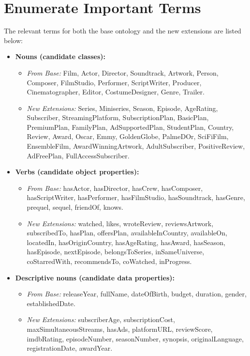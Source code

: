 \chapter{Enumerate Important Terms}
The relevant terms for both the base ontology and the new extensions are listed below:

\begin{itemize}
    \item \textbf{Nouns (candidate classes):}
    \begin{itemize}
        \item \textit{From Base:} Film, Actor, Director, Soundtrack, Artwork, Person, Composer, FilmStudio, Performer, ScriptWriter, Producer, Cinematographer, Editor, CostumeDesigner, Genre, Trailer.
        \item \textit{New Extensions:} Series, Miniseries, Season, Episode, AgeRating, Subscriber, StreamingPlatform, SubscriptionPlan, BasicPlan, PremiumPlan, FamilyPlan, AdSupportedPlan, StudentPlan, Country, Review, Award, Oscar, Emmy, GoldenGlobe, PalmeDOr, SciFiFilm, EnsembleFilm, AwardWinningArtwork, AdultSubscriber, PositiveReview, AdFreePlan, FullAccessSubscriber.
    \end{itemize}
    \item \textbf{Verbs (candidate object properties):}
    \begin{itemize}
        \item \textit{From Base:} hasActor, hasDirector, hasCrew, hasComposer, hasScriptWriter, hasPerformer, hasFilmStudio, hasSoundtrack, hasGenre, prequel, sequel, friendOf, knows.
        \item \textit{New Extensions:} watched, likes, wroteReview, reviewsArtwork, subscribedTo, hasPlan, offersPlan, availableInCountry, availableOn, locatedIn, hasOriginCountry, hasAgeRating, hasAward, hasSeason, hasEpisode, nextEpisode, belongsToSeries, inSameUniverse, coStarredWith, recommendsTo, coWatched, inProgress.
    \end{itemize}
    \item \textbf{Descriptive nouns (candidate data properties):}
    \begin{itemize}
        \item \textit{From Base:} releaseYear, fullName, dateOfBirth, budget, duration, gender, establishedDate.
        \item \textit{New Extensions:} subscriberAge, subscriptionCost, maxSimultaneousStreams, hasAds, platformURL, reviewScore, imdbRating, episodeNumber, seasonNumber, synopsis, originalLanguage, registrationDate, awardYear.
    \end{itemize}
\end{itemize}
